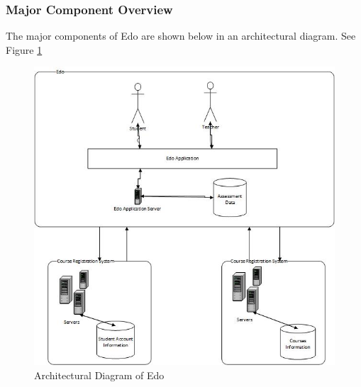 \documentclass[paper=a4, fontsize=11pt]{scrartcl}
\numberwithin{equation}{section}		%
\numberwithin{figure}{section}			%
\numberwithin{table}{section}				%
\begin{document}
\subsubsection{Major Component Overview}
The major components of Edo are shown below in an architectural diagram. See Figure \ref{archi}
	
\begin{figure}[!ht]
	\begin{center}
		\includegraphics[width=\textwidth,height=\textheight,keepaspectratio]{archi}
	\end{center}
	\caption{Architectural Diagram of Edo}
	\label{archi}
\end{figure}

\end{document}
